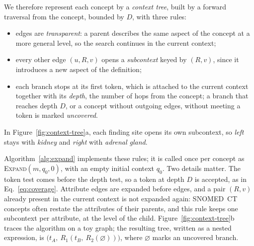 We therefore represent each concept by a \emph{context tree}, built by a forward traversal from the concept, bounded by $D$, with three rules:
\begin{itemize}
    \item \isa{} edges are \emph{transparent}: a parent describes the same aspect of the concept at a more general level, so the search continues in the current context;
    \item every other edge $(u, R, v)$ opens a \emph{subcontext} keyed by $(R, v)$, since it introduces a new aspect of the definition;
    \item each branch stops at its first token, which is attached to the current context together with its \emph{depth}, the number of hops from the concept; a branch that reaches depth $D$, or a concept without outgoing edges, without meeting a token is marked \emph{uncovered}.
\end{itemize}
In Figure~\ref{fig:context-tree}a, each finding site opens its own subcontext, so \textit{left} stays with \textit{kidney} and \textit{right} with \textit{adrenal gland}.

Algorithm~\ref{alg:expand} implements these rules; it is called once per concept as \textsc{Expand}$(m, q_0, 0)$, with an empty initial context $q_0$.
Two details matter.
The token test comes before the depth test, so a token at depth $D$ is accepted, as in Eq.~\eqref{eq:coverage}.
Attribute edges are expanded before \isa{} edges, and a pair $(R, v)$ already present in the current context is not expanded again: SNOMED~CT concepts often restate the attributes of their parents, and this rule keeps one subcontext per attribute, at the level of the child.
Figure~\ref{fig:context-tree}b traces the algorithm on a toy graph; the resulting tree, written as a nested expression, is $\big(t_A,\ R_1(t_B,\ R_2(\varnothing))\big)$, where $\varnothing$ marks an uncovered branch.

